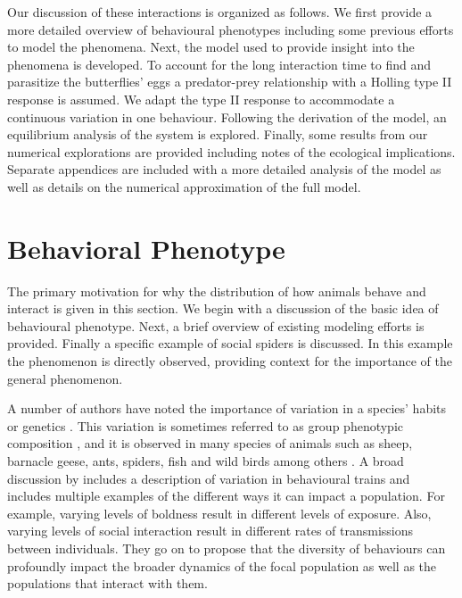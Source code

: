 \documentclass[review,authoryear]{elsarticle}
\begin{document}
Our discussion of these interactions is organized as follows. We first provide a more detailed overview of behavioural phenotypes
including some previous efforts to model the phenomena. Next, the
model used to provide insight into the phenomena is developed.
To account for the long interaction time to find and parasitize the butterflies' eggs a predator-prey relationship  with a Holling type II response \citep{TEWA20134825,holling_1959A,holling_1959B} is assumed. We adapt the type II response to accommodate a continuous
variation in one behaviour.  Following the derivation of the model, an equilibrium analysis of the system is explored. Finally, some results from our numerical explorations are provided including notes of the ecological implications. Separate appendices are included with a more detailed analysis of the model as well as details on the numerical approximation of the full model.

\section{Behavioral Phenotype}
\label{section:behaviouralPhenotype}

The primary motivation for why the distribution of how animals behave
and interact is given in this section. We begin with a discussion of
the basic idea of behavioural phenotype. Next, a brief overview of
existing modeling efforts is provided. Finally a specific example of
social spiders is discussed. In this example the phenomenon
is
directly observed, providing context for the importance of the
general phenomenon.

A number of authors have noted the importance of variation
in a species' habits or
genetics \citep{doi:10.1111/j.1461-0248.2010.01536.x,doi:10.1086/687235,mierzejewski_horn_luong_2019,SANTICCHIA20191,doi:10.1098/rspb.2014.1016}. This variation is sometimes referred to as group phenotypic composition \citep{FARINE2015609}, and it is observed in many species of animals such as sheep, barnacle geese, ants, spiders, fish and wild birds among others \citep{sibbald2009individual,kurvers2011effect,modlmeier2012diverse,doi:10.1086/687235,doi:10.1098/rspb.2014.1016,doi:10.1037/0735-7036.107.3.250}.
A broad discussion by  \citep{doi:10.1111/j.1461-0248.2010.01536.x} includes a description of variation in behavioural trains and includes multiple examples of the different ways it can impact a population. For example, varying levels of boldness result in different levels of exposure. Also, varying levels of social interaction result in different rates of transmissions between individuals. They go on to  propose that the diversity of
behaviours can profoundly impact the broader dynamics of the focal population as well as the populations that interact with them.
\end{document}
